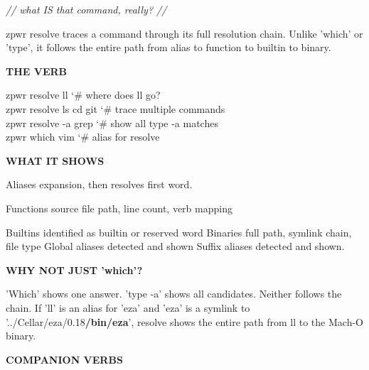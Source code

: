 \documentclass[11pt,a4paper,twoside]{book}
\begin{document}
{\small\itshape\color{dimtext} // what IS that command, really? //}

zpwr resolve traces a command through its full resolution chain. Unlike 'which' or 'type', it follows the entire path from alias to function to builtin to binary.


\vspace{12pt}
{\bfseries\color{neonyellow} THE VERB}\vspace{4pt}

\begin{codebox}
\color{neongreen}zpwr resolve ll               {\char`\#} where does ll go?\\
\color{neongreen}zpwr resolve ls cd git        {\char`\#} trace multiple commands\\
\color{neongreen}zpwr resolve -a grep          {\char`\#} show all type -a matches\\
\color{neongreen}zpwr which vim                {\char`\#} alias for resolve\\
\end{codebox}


\vspace{12pt}
{\bfseries\color{neonyellow} WHAT IT SHOWS}\vspace{4pt}

Aliases          expansion, then resolves first word.

\begin{codebox}
\color{neongreen}Functions        source file path, line count, verb mapping\\
\end{codebox}

Builtins         identified as builtin or reserved word Binaries         full path, symlink chain, file type Global aliases   detected and shown Suffix aliases   detected and shown.


\vspace{12pt}
{\bfseries\color{neonyellow} WHY NOT JUST 'which'?}\vspace{4pt}

'Which' shows one answer. 'type -a' shows all candidates. Neither follows the chain. If 'll' is an alias for 'eza' and 'eza' is a symlink to '../Cellar/eza/0.18\textbf{\textbf{/bin/eza}}', resolve shows the entire path from ll to the Mach-O binary.


\vspace{12pt}
{\bfseries\color{neonyellow} COMPANION VERBS}\vspace{4pt}
\end{document}
